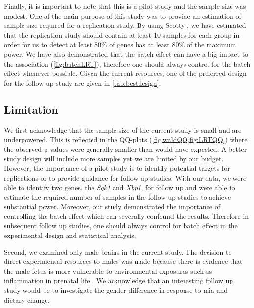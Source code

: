 Finally, it is important to note that this is a pilot study and the sample size was modest. 
One of the main purpose of this study was to provide an estimation of sample size required for a replication study.
By using Scotty \citep{Busby2013}, we have estimated that the replication study should contain at least 10 samples for each group in order for us to detect at least 80\% of genes has at least 80\% of the maximum power. 
We have also demonstrated that the batch effect can have a big impact to the association (\cref{fig:batchLRT}), therefore one should always control for the batch effect whenever possible.
Given the current resources, one of the preferred design for the follow up study are given in \cref{tab:bestdesign}.

\subsection{Limitation}
We first acknowledge that the sample size of the current study is small and are underpowered.
This is reflected in the QQ-plots (\cref{fig:waldQQ,fig:LRTQQ}) where the observed p-values were generally smaller than would have expected.
A better study design will include more samples yet we are limited by our budget.
However, the importance of a pilot study is to identify potential targets for replications or to provide guidance for follow up studies. 
With our data, we were able to identify two genes, the \textit{Sgk1} and \textit{Xbp1}, for follow up and were able to estimate the required number of samples in the follow up studies to achieve substantial power.
Moreover, our study demonstrated the importance of controlling the batch effect which can severally confound the results.
Therefore in subsequent follow up studies, one should always control for batch effect in the experimental design and statistical analysis.

Second, we examined only male brains in the current study. 
The decision to direct experimental resources to males was made because there is evidence that the male fetus is more vulnerable to environmental exposures such as inflammation in prenatal life \citep{Bergeron2013,Lein2007}. 
We acknowledge that an interesting follow up study would be to investigate the gender difference in response to \gls{mia} and dietary change.

